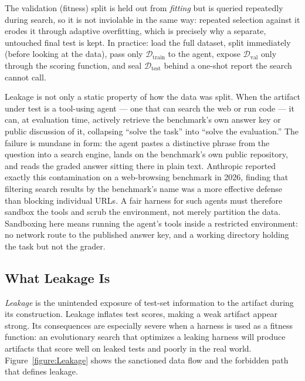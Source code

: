 The validation (fitness) split is held out from \emph{fitting} but is queried repeatedly during search, so it is not inviolable in the same way: repeated selection against it erodes it through adaptive overfitting, which is precisely why a separate, untouched final test is kept.
In practice: load the full dataset, split immediately (before looking at the data), pass only $\mathcal{D}_{\mathrm{train}}$ to the agent, expose $\mathcal{D}_{\mathrm{val}}$ only through the scoring function, and seal $\mathcal{D}_{\mathrm{test}}$ behind a one-shot report the search cannot call.

Leakage is not only a static property of how the data was split.
When the artifact under test is a tool-using agent --- one that can search the web or run code --- it can, at evaluation time, actively retrieve the benchmark's own answer key or public discussion of it, collapsing ``solve the task'' into ``solve the evaluation.''
The failure is mundane in form: the agent pastes a distinctive phrase from the question into a search engine, lands on the benchmark's own public repository, and reads the graded answer sitting there in plain text.
Anthropic reported exactly this contamination on a web-browsing benchmark in 2026, finding that filtering search results by the benchmark's name was a more effective defense than blocking individual URLs.
A fair harness for such agents must therefore sandbox the tools and scrub the environment, not merely partition the data.
Sandboxing here means running the agent's tools inside a restricted environment: no network route to the published answer key, and a working directory holding the task but not the grader.

\subsection{What Leakage Is}

\emph{Leakage} is the unintended exposure of test-set information to the artifact during its construction.
Leakage inflates test scores, making a weak artifact appear strong.
Its consequences are especially severe when a harness is used as a fitness function: an evolutionary search that optimizes a leaking harness will produce artifacts that score well on leaked tests and poorly in the real world.
Figure~\ref{figure:Leakage} shows the sanctioned data flow and the forbidden path that defines leakage.

